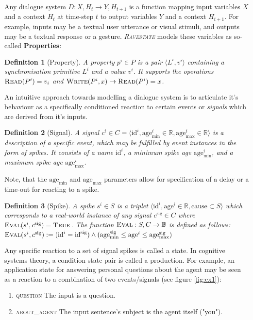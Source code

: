 \documentclass{article}
\newcommand{\rasta}{\textit{\textsc{Ravestate}}\xspace}
\newcommand{\mathsc}[1]{\text{\textsc{#1}}}
\newtheorem{definition}{Definition}
\begin{document}
\begin{multicols}{2}
Any dialogue system $D: X,H_t \rightarrow Y,H_{t+1}$ is a function mapping input variables $X$ and a context $H_t$ at time-step $t$ to output variables $Y$ and a context $H_{t+1}$. For example, inputs may be a textual user utterance or visual stimuli, and outputs may be a textual response or a gesture. \rasta models these variables as so-called \textbf{Properties}:

\begin{definition}[Property]
A property $p^i \in P$ is a pair $\langle L^i, v^i \rangle$ containing a synchronisation primitive $L^i$ and a value $v^i$. It supports the operations $\mathsc{Read}(P^i) = v_i$ and $\mathsc{Write}(P^i, x) \rightarrow \mathsc{Read}(P^i) = x$.
\end{definition}

An intuitive approach towards modelling a dialogue system is to articulate it's behaviour as a specifically conditioned reaction to certain events or \textit{signals} which are derived from it's inputs.

\begin{definition}[Signal]
A signal $c^i \in C = \langle \text{id}^i, \text{age}^i_\text{min} \in \mathbb{R}, \text{age}^i_\text{max} \in \mathbb{R} \rangle$ is a description of a specific event, which may be fulfilled by event instances in the form of \textit{spikes}. It consists of a name $\text{id}^i$, a minimum spike age $\text{age}^i_\text{min}$, and a maximum spike age $\text{age}^i_\text{max}$.
\end{definition}

Note, that the $\text{age}_\text{min}$ and $\text{age}_\text{max}$ parameters allow for specification of a delay or a time-out for reacting to a spike.

\begin{definition}[Spike]
A spike $s^i \in S$ is a triplet $\langle \text{id}^i, \text{age}^i \in \mathbb{R}, \text{cause} \subset S \rangle$ which corresponds to a real-world instance of any signal $c^\text{sig} \in C$ where $\mathsc{Eval}(s^i, c^\text{sig}) =  \mathsc{True}$. The function $\mathsc{Eval}: S, C \rightarrow \mathbb{B}$ is defined as follows: $\mathsc{Eval}(s^i, c^\text{sig}) := (\text{id}^i = \text{id}^\text{sig}) \land (\text{age}^\text{sig}_\text{min} \leq \text{age}^i \leq \text{age}^\text{sig}_\text{max})$
\end{definition}

Any specific reaction to a set of signal spikes is called a state. In cognitive systems theory, a condition-state pair is called a production. For example, an application state for answering personal questions about the agent may be seen as a reaction to a combination of two events/signals (see figure \ref{fig:ex1}):
\begin{enumerate}
    \item \textsc{question} The input is a question.
    \item \textsc{about\_agent} The input sentence's subject is the agent itself ("you").
\end{enumerate}


\end{multicols}
\end{document}
